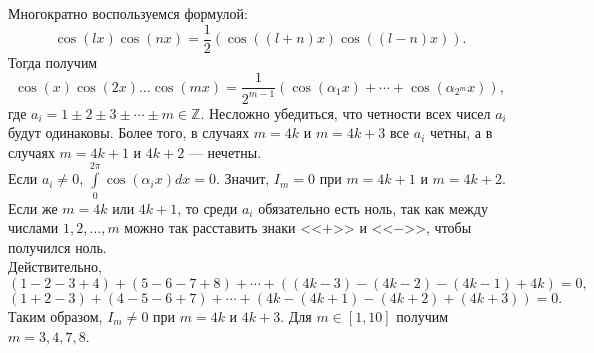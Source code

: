 \documentclass{article}
\begin{document}
Многократно воспользуемся формулой:
$$\cos (lx) \cos (nx) = \frac12 (\cos ((l+n)x) \cos ((l-n)x)).$$
Тогда получим
$$\cos (x) \cos (2x) \ldots \cos (mx) = \frac{1}{2^{m-1}} ( \cos (\alpha_1 x) + \cdots + \cos(\alpha_{2^m} x) ),$$
где $a_i = 1 \pm 2 \pm 3 \pm \cdots \pm m \in \mathbb{Z}$. Несложно убедиться, что четности всех чисел $a_i$ будут одинаковы. Более того, в случаях $m=4k$ и $m=4k+3$ все $a_i$ четны, а в случаях $m=4k+1$ и $4k+2$ --- нечетны.\\
Если $a_i \neq 0$, $\int\limits_0^{2\pi} \cos (\alpha_i x) dx = 0$. Значит, $I_m = 0$ при $m=4k+1$ и $m=4k+2$. Если же $m=4k$ или $4k+1$, то среди $a_i$ обязательно есть ноль, так как между числами $1,2,\ldots,m$ можно так расставить знаки <<$+$>> и <<$-$>>, чтобы получился ноль.\\
Действительно,
$$(1-2-3+4)+(5-6-7+8) + \cdots + ((4k-3) - (4k-2) - (4k-1) + 4k) = 0,$$
$$(1+2-3)+(4-5-6+7) + \cdots + (4k - (4k+1) - (4k+2) + (4k+3)) = 0.$$
Таким образом, $I_m \neq 0$ при $m=4k$ и $4k+3$. Для $m \in [1,10]$ получим $m=3,4,7,8$.
\end{document}
